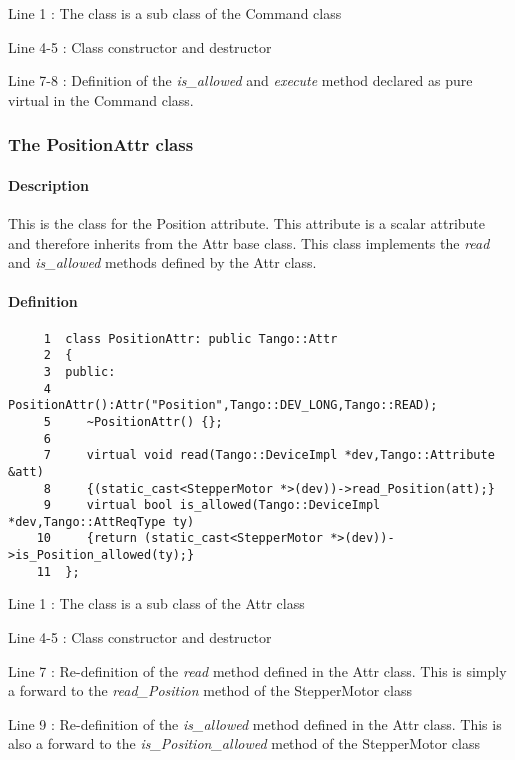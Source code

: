 Line 1 : The class is a sub class of the Command class

Line 4-5 : Class constructor and destructor

Line 7-8 : Definition of the \emph{is\_allowed} and \emph{execute}
method declared as pure virtual in the Command class.


\subsubsection{The PositionAttr class}


\paragraph{Description}

This is the class for the Position attribute. This attribute is a
scalar attribute and therefore inherits from the Attr base class.
This class implements the \emph{read} and \emph{is\_allowed}
methods defined by the Attr class.


\paragraph{Definition}


\begin{verbatim}
     1  class PositionAttr: public Tango::Attr
     2  {
     3  public:
     4     PositionAttr():Attr("Position",Tango::DEV_LONG,Tango::READ);
     5     ~PositionAttr() {};
     6          
     7     virtual void read(Tango::DeviceImpl *dev,Tango::Attribute &att)
     8     {(static_cast<StepperMotor *>(dev))->read_Position(att);}
     9     virtual bool is_allowed(Tango::DeviceImpl *dev,Tango::AttReqType ty)
    10     {return (static_cast<StepperMotor *>(dev))->is_Position_allowed(ty);}
    11  };
\end{verbatim}


Line 1 : The class is a sub class of the Attr class

Line 4-5 : Class constructor and destructor

Line 7 : Re-definition of the \emph{read} method defined in the Attr
class. This is simply a \textquotedbl{}forward\textquotedbl{} to the
\emph{read\_Position} method of the StepperMotor class

Line 9 : Re-definition of the \emph{is\_allowed} method defined in
the Attr class. This is also a \textquotedbl{}forward\textquotedbl{}
to the \emph{is\_Position\_allowed} method of the StepperMotor class


